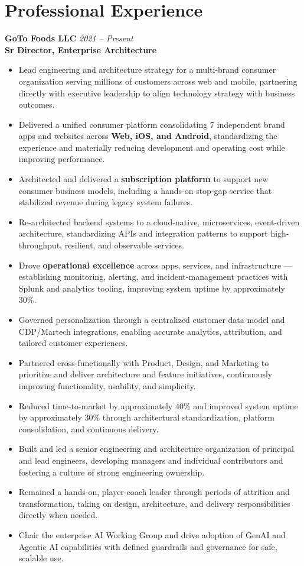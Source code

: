 \documentclass[11pt]{article}
\begin{document}
\section*{Professional Experience}

\textbf{GoTo Foods LLC} \hfill \textit{2021 -- Present} \\
\textbf{Sr Director, Enterprise Architecture}

\begin{itemize}
  \item Lead engineering and architecture strategy for a multi-brand consumer organization serving millions of customers across web and mobile, partnering directly with executive leadership to align technology strategy with business outcomes.
  \item Delivered a unified consumer platform consolidating 7 independent brand apps and websites across \textbf{Web, iOS, and Android}, standardizing the experience and materially reducing development and operating cost while improving performance.
  \item Architected and delivered a \textbf{subscription platform} to support new consumer business models, including a hands-on stop-gap service that stabilized revenue during legacy system failures.
  \item Re-architected backend systems to a cloud-native, microservices, event-driven architecture, standardizing APIs and integration patterns to support high-throughput, resilient, and observable services.
  \item Drove \textbf{operational excellence} across apps, services, and infrastructure --- establishing monitoring, alerting, and incident-management practices with Splunk and analytics tooling, improving system uptime by approximately 30\%.
  \item Governed personalization through a centralized customer data model and CDP/Martech integrations, enabling accurate analytics, attribution, and tailored customer experiences.
  \item Partnered cross-functionally with Product, Design, and Marketing to prioritize and deliver architecture and feature initiatives, continuously improving functionality, usability, and simplicity.
  \item Reduced time-to-market by approximately 40\% and improved system uptime by approximately 30\% through architectural standardization, platform consolidation, and continuous delivery.
  \item Built and led a senior engineering and architecture organization of principal and lead engineers, developing managers and individual contributors and fostering a culture of strong engineering ownership.
  \item Remained a hands-on, player-coach leader through periods of attrition and transformation, taking on design, architecture, and delivery responsibilities directly when needed.
  \item Chair the enterprise AI Working Group and drive adoption of GenAI and Agentic AI capabilities with defined guardrails and governance for safe, scalable use.
\end{itemize}
\end{document}
